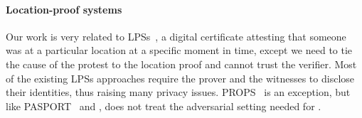 \paragraph{Location-proof systems}%
\label{location-proof-systems}

Our work is very related to \acp{LPS}~\cite{luo2010veriplace,zhu2011applaus}, a digital certificate attesting that someone was at 
a particular location at a specific moment in time, except we need to
tie the cause of the protest to the location proof and cannot trust
the verifier. Most of the existing  \acp{LPS} approaches require the prover and the 
witnesses to disclose their identities, thus raising many privacy
issues.
PROPS~\cite{PROPS} is  an exception, but like PASPORT~\cite{PASPORT}
and \Textcite{ProofOfWitnessPresence}, does not treat the adversarial
setting needed for \CROCUS. 


